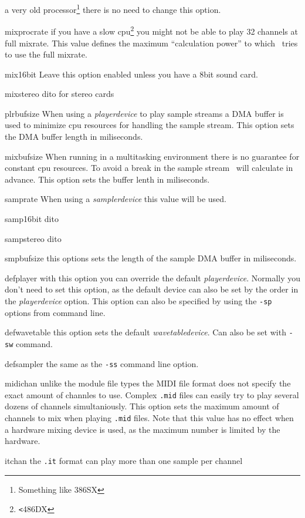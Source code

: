 \begin{dojlist}
a very old processor\footnote{Something like 386SX} there is no need
to change this option.
\item[mixprocrate] if you have a slow cpu\footnote{\texttt{<}486DX} you might 
not be able to play 32 channels at full mixrate. This value defines
the maximum ``calculation power'' to which \cp\ tries to use the full
mixrate.
\item[mix16bit] Leave this option enabled unless you have a 8bit sound card.
\item[mixstereo] dito for stereo cards
\item[plrbufsize] When using a \emph{playerdevice} to play sample streams a DMA
buffer is used to minimize cpu resources for handling the sample
stream. This option sets the DMA buffer length in miliseconds.
\item[mixbufsize] When running in a multitasking environment there is no
guarantee for constant cpu resources. To avoid a break in the sample
stream \cp\ will calculate in advance. This option sets the buffer lenth in
miliseconds.
\item[samprate] When using a \emph{samplerdevice} this value will be used.
\item[samp16bit] dito
\item[sampstereo] dito
\item[smpbufsize] this options sets the length of the sample DMA buffer in
miliseconds.
\item[defplayer] with this option you can override the default
\emph{playerdevice}. Normally you don't need to set this option, as the
default device can also be set by the order in the \emph{playerdevice}
option.  This option can also be specified by using the \texttt{-sp}
options from command line.
\item[defwavetable] this option sets the default \emph{wavetabledevice}. Can
also be set with \texttt{-sw} command.
\item[defsampler] the same as the \texttt{-ss} command line option.
\item[midichan] unlike the module file types the MIDI file format does not
specify the exact amount of channles to use. Complex \texttt{.mid}
files can easily try to play several dozens of channels
simultaniously. This option sets the maximum amount of channels to mix
when playing \texttt{.mid} files. Note that this value has no effect
when a hardware mixing device is used, as the maximum number is
limited by the hardware.
\item[itchan] the \texttt{.it} format can play more than one sample per channel

\end{dojlist}
